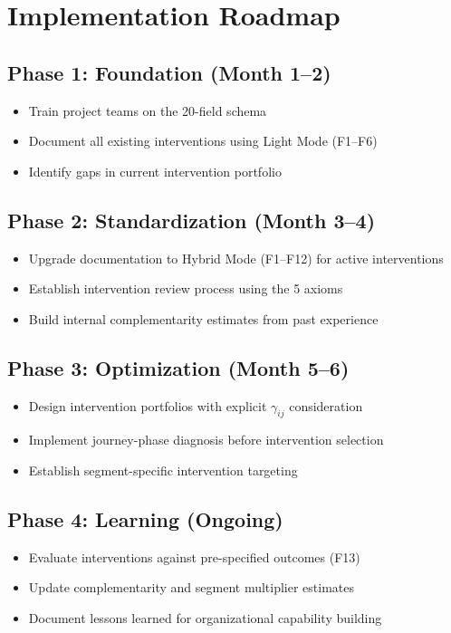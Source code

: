 \documentclass[11pt,a4paper]{article}
\begin{document}
\newpage
\section{Implementation Roadmap}

\subsection{Phase 1: Foundation (Month 1--2)}
\begin{itemize}[nosep]
\item Train project teams on the 20-field schema
\item Document all existing interventions using Light Mode (F1--F6)
\item Identify gaps in current intervention portfolio
\end{itemize}

\subsection{Phase 2: Standardization (Month 3--4)}
\begin{itemize}[nosep]
\item Upgrade documentation to Hybrid Mode (F1--F12) for active interventions
\item Establish intervention review process using the 5 axioms
\item Build internal complementarity estimates from past experience
\end{itemize}

\subsection{Phase 3: Optimization (Month 5--6)}
\begin{itemize}[nosep]
\item Design intervention portfolios with explicit $\gamma_{ij}$ consideration
\item Implement journey-phase diagnosis before intervention selection
\item Establish segment-specific intervention targeting
\end{itemize}

\subsection{Phase 4: Learning (Ongoing)}
\begin{itemize}[nosep]
\item Evaluate interventions against pre-specified outcomes (F13)
\item Update complementarity and segment multiplier estimates
\item Document lessons learned for organizational capability building
\end{itemize}
\end{document}
